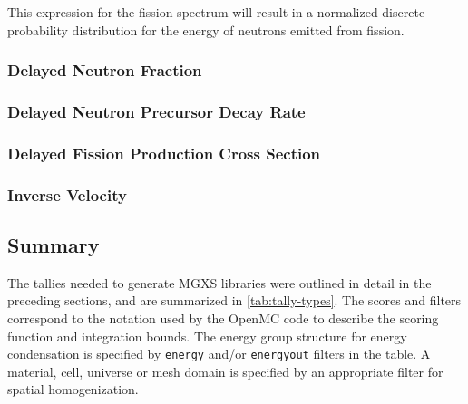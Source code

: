 \noindent This expression for the fission spectrum will result in a normalized discrete probability distribution for the energy of neutrons emitted from fission.

\subsubsection{Delayed Neutron Fraction}
\label{subsubsec:tally-types-beta}

\subsubsection{Delayed Neutron Precursor Decay Rate}
\label{subsubsec:tally-types-lambda}

\subsubsection{Delayed Fission Production Cross Section}
\label{subsubsec:tally-types-delay-fiss-prod}

\subsubsection{Inverse Velocity}
\label{subsubsec:tally-types-inv-vel}


\subsection{Summary}
\label{subsec:tally-types-summary}

The tallies needed to generate MGXS libraries were outlined in detail in the preceding sections, and are summarized in \autoref{tab:tally-types}. The scores and filters correspond to the notation used by the OpenMC code to describe the scoring function and integration bounds. The energy group structure for energy condensation is specified by \texttt{energy} and/or \texttt{energyout} filters in the table. A material, cell, universe or mesh domain is specified by an appropriate filter for spatial homogenization.

